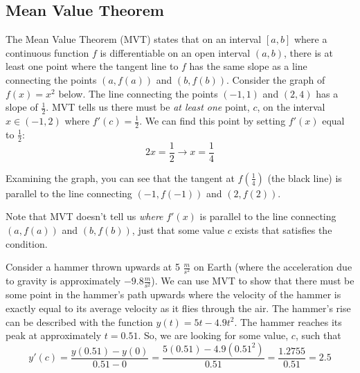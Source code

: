 \subsection{Mean Value Theorem}

The Mean Value Theorem (MVT) states that on an interval $[a, b]$ where a continuous function $f$ is differentiable on an open interval $(a, b)$, there is at least one point where the tangent line to $f$ has the same slope as a line connecting the points $(a, f(a))$ and $(b, f(b))$. Consider the graph of $f(x) = x^2$ below. The line connecting the points $(-1, 1)$ and $(2, 4)$ has a slope of $\frac{1}{2}$. MVT tells us there must be \textit{at least one} point, $c$, on the interval $x \in (-1, 2)$ where $f'(c) = \frac{1}{2}$. We can find this point by setting $f'(x)$ equal to $\frac{1}{2}$: $$2x=\frac{1}{2} \rightarrow x=\frac{1}{4}$$

Examining the graph, you can see that the tangent at $f(\frac{1}{4})$ (the black line) is parallel to the line connecting $(-1, f(-1))$ and $(2, f(2))$. 


Note that MVT doesn't tell us \textit{where} $f'(x)$ is parallel to the line connecting $(a, f(a))$ and $(b, f(b))$, just that some value $c$ exists that satisfies the condition. 

Consider a hammer thrown upwards at 5 $\frac{m}{s^2}$ on Earth (where the acceleration due to gravity is approximately $-9.8 \frac{m}{s^2}$). We can use MVT to show that there must be some point in the hammer's path upwards where the velocity of the hammer is exactly equal to its average velocity as it flies through the air. 
The hammer's rise can be described with the function $y(t) = 5t-4.9t^2$. The hammer reaches its peak at approximately $t=0.51$. So, we are looking for some value, $c$, such that $$y'(c) = \frac{y(0.51)-y(0)}{0.51-0}=\frac{5(0.51)-4.9(0.51^2)}{0.51}=\frac{1.2755}{0.51}=2.5$$

